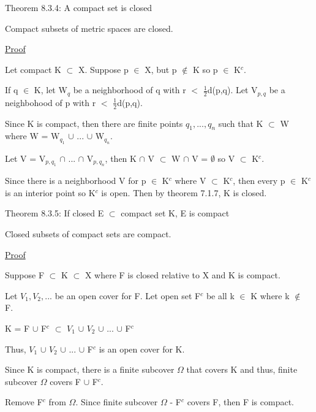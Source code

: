 { \color{red} Theorem 8.3.4: A compact set is closed } 

	\begin{adjustbox}{minipage=14cm, right, vspace=0.1cm 0cm}
		Compact subsets of metric spaces are closed.
	\end{adjustbox}

{ \color{magenta} \underline{Proof} } 

	Let compact K $\subset$ X.
	Suppose p $\in$ X, but p $\not \in$ K so p $\in$ K$^c$.

	If q $\in$ K, let W$_q$ be a neighborhood of q with
	r $<$ $\frac{1}{2}$d(p,q).
	Let V$_{p,q}$ be a neighbohood of p with r $<$ $\frac{1}{2}$d(p,q).

	Since K is compact, then there are finite points $q_1, ... , q_n$
	such that K $\subset$ W where W = W$_{q_1}$ $\cup$ ... $\cup$ W$_{q_n}$.

	Let V = V$_{p,q_1}$ $\cap$ ... $\cap$ V$_{p,q_n}$, then
	K $\cap$ V $\subset$ W $\cap$ V = $\emptyset$ so V $\subset$ K$^c$.

	Since there is a neighborhood V for p $\in$ K$^c$ where V $\subset$ K$^c$,
	then every p $\in$ K$^c$ is an interior point so K$^c$ is open.
	Then by {\color{red} theorem 7.1.7}, K is closed. \\

\newpage

{ \color{red} Theorem 8.3.5: If closed E $\subset$ compact set K, E is compact } 

	\begin{adjustbox}{minipage=14cm, right, vspace=0.1cm 0cm}
		Closed subsets of compact sets are compact.
	\end{adjustbox}

{ \color{magenta} \underline{Proof} } 

	Suppose F $\subset$ K $\subset$ X where F is closed relative to X
	and K is compact.

	Let $V_1, V_2, ...$ be an open cover for F.
	Let open set F$^c$ be all k $\in$ K where k $\not \in$ F.

	\qquad K = F $\cup$ F$^c$ $\subset$ $V_1$ $\cup$ $V_2$ $\cup$ ... $\cup$ F$^c$

	Thus, $V_1$ $\cup$ $V_2$ $\cup$ ... $\cup$ F$^c$ is an open cover for K.

	Since K is compact, there is a finite subcover $\Omega$ that covers K
	and thus, finite subcover $\Omega$ covers F $\cup$ F$^c$.
	
	Remove F$^c$ from $\Omega$. Since finite subcover $\Omega$ - F$^c$ covers F,
	then F is compact. \\

